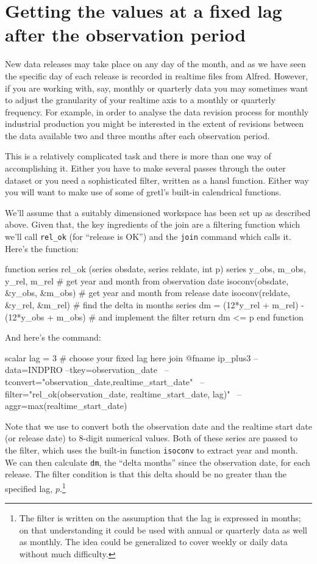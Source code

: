 \section{Getting the values at a fixed lag after the observation
  period}
\label{sec:realtime-fixed-lag}

New data releases may take place on any day of the month, and as we
have seen the specific day of each release is recorded in realtime
files from Alfred. However, if you are working with, say, monthly or
quarterly data you may sometimes want to adjust the granularity of
your realtime axis to a monthly or quarterly frequency. For example,
in order to analyse the data revision process for monthly industrial
production you might be interested in the extent of revisions between
the data available two and three months after each observation period.

This is a relatively complicated task and there is more than one way
of accomplishing it. Either you have to make several passes through
the outer dataset or you need a sophisticated filter, written as a
hansl function. Either way you will want to make use of some of
gretl's built-in calendrical functions.

We'll assume that a suitably dimensioned workspace has been set up as
described above. Given that, the key ingredients of the join are a
filtering function which we'll call \verb|rel_ok| (for ``release is
OK'') and the \texttt{join} command which calls it. Here's the
function:
%
\begin{code}
function series rel_ok (series obsdate, series reldate, int p)
  series y_obs, m_obs, y_rel, m_rel
  # get year and month from observation date
  isoconv(obsdate, &y_obs, &m_obs)
  # get year and month from release date
  isoconv(reldate, &y_rel, &m_rel)
  # find the delta in months
  series dm = (12*y_rel + m_rel) - (12*y_obs + m_obs)
  # and implement the filter
  return dm <= p
end function
\end{code}
%
And here's the command:
%
\begin{code}
scalar lag = 3  # choose your fixed lag here
join @fname ip_plus3 --data=INDPRO --tkey=observation_date \
--tconvert="observation_date,realtime_start_date" \
--filter="rel_ok(observation_date, realtime_start_date, lag)" \
--aggr=max(realtime_start_date)
\end{code}

Note that we use  to convert both the observation
date and the realtime start date (or release date) to 8-digit
numerical values. Both of these series are passed to the filter, which
uses the built-in function \texttt{isoconv} to extract year and month.
We can then calculate \texttt{dm}, the ``delta months'' since the
observation date, for each release.  The filter condition is that this
delta should be no greater than the specified lag, $p$.\footnote{The
  filter is written on the assumption that the lag is expressed in
  months; on that understanding it could be used with annual or
  quarterly data as well as monthly. The idea could be generalized to
  cover weekly or daily data without much difficulty.}

